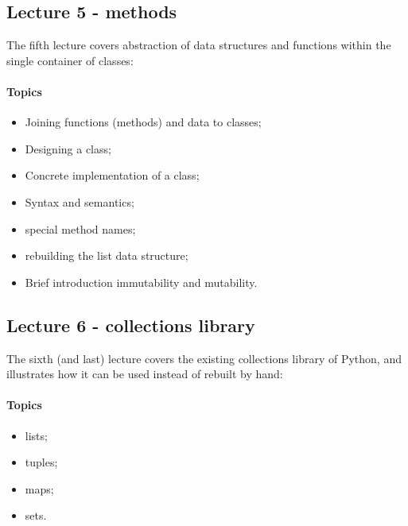 			\subsection{Lecture 5 - methods}
				The fifth lecture covers abstraction of data structures and functions within the single container of classes:

				\paragraph*{Topics}
					\begin{itemize}
						\item Joining functions (methods) and data to classes;
						\item Designing a class;
						\item Concrete implementation of a class;
						\item Syntax and semantics;
						\item special method names;
						\item rebuilding the list data structure;
						\item Brief introduction immutability and mutability.
					\end{itemize}

			\subsection{Lecture 6 - collections library}
				The sixth (and last) lecture covers the existing collections library of Python, and illustrates how it can be used instead of rebuilt by hand:

				\paragraph*{Topics}
					\begin{itemize}
						\item lists;
						\item tuples;
						\item maps;
						\item sets.
					\end{itemize}
